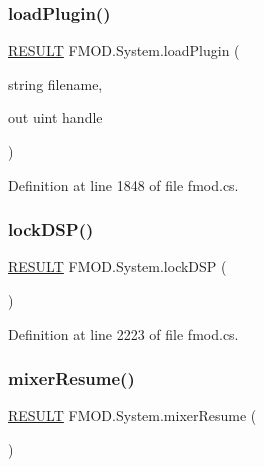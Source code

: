 \subsubsection{\texorpdfstring{load\+Plugin()}{loadPlugin()}\hspace{0.1cm}{\footnotesize\ttfamily [2/2]}}
{\footnotesize\ttfamily \hyperlink{namespace_f_m_o_d_a305d1176ef3f8c8815861a60407ac33d}{R\+E\+S\+U\+LT} F\+M\+O\+D.\+System.\+load\+Plugin (\begin{DoxyParamCaption}\item[{string}]{filename,  }\item[{out uint}]{handle }\end{DoxyParamCaption})}



Definition at line 1848 of file fmod.\+cs.

\mbox{\label{class_f_m_o_d_1_1_system_a1797d53f2af1ad6d9d97d903e1888feb}} 
\subsubsection{\texorpdfstring{lock\+D\+S\+P()}{lockDSP()}}
{\footnotesize\ttfamily \hyperlink{namespace_f_m_o_d_a305d1176ef3f8c8815861a60407ac33d}{R\+E\+S\+U\+LT} F\+M\+O\+D.\+System.\+lock\+D\+SP (\begin{DoxyParamCaption}{ }\end{DoxyParamCaption})}



Definition at line 2223 of file fmod.\+cs.

\mbox{\label{class_f_m_o_d_1_1_system_a3351b73b749f572057e24a1ff069ef34}} 
\subsubsection{\texorpdfstring{mixer\+Resume()}{mixerResume()}}
{\footnotesize\ttfamily \hyperlink{namespace_f_m_o_d_a305d1176ef3f8c8815861a60407ac33d}{R\+E\+S\+U\+LT} F\+M\+O\+D.\+System.\+mixer\+Resume (\begin{DoxyParamCaption}{ }\end{DoxyParamCaption})}



